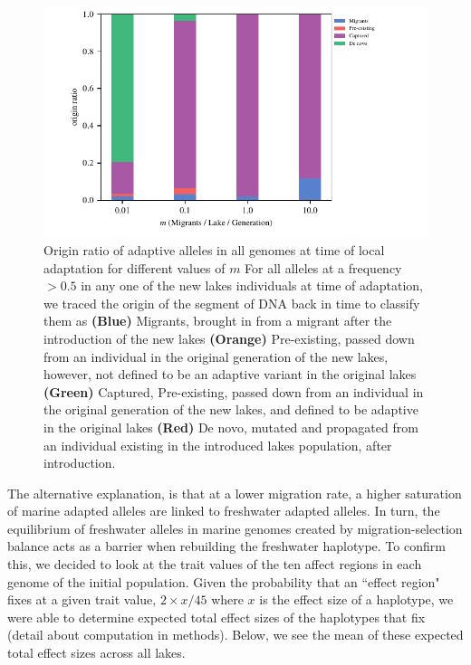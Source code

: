 \documentclass{article}
\begin{document}
\begin{figure}
	\begin{center}
  		\includegraphics[width=0.7\linewidth]{Final_Plots/Allele_Origin.pdf}
  		\caption{ 
		Origin ratio of adaptive alleles in all genomes at time of local adaptation for different values of $m$
		For all alleles at a frequency $> 0.5$ in any one of the new lakes individuals at time of adaptation, 
		we traced the origin of the segment of DNA back in time to classify them as 
		\textbf{(Blue)} Migrants, brought in from a migrant after the introduction of the new lakes 
		\textbf{(Orange)} Pre-existing, passed down from an individual in the original generation of the new lakes, 
		however, not defined to be an adaptive variant in the original lakes
		\textbf{(Green)} Captured, Pre-existing, passed down from an individual in the original generation of the new lakes, 
		and defined to be adaptive in the original lakes
		\textbf{(Red)} De novo, mutated and propagated from an individual existing in the introduced lakes population, after introduction. 
		}
  		\label{fig:Origin}
	\end{center}
\end{figure}

The alternative explanation, is that at a lower migration rate, a higher saturation of marine adapted alleles are linked to freshwater adapted alleles.
In turn, the equilibrium of freshwater alleles in marine genomes created by migration-selection balance acts as a barrier when rebuilding the freshwater haplotype. 
To confirm this, we decided to look at the trait values of the ten affect regions in each genome of the initial population.
Given the probability that an ``effect region" fixes at a given trait value, $2 \times x / 45$ where $x$ is the effect size of a haplotype,
we were able to determine expected total effect sizes of the haplotypes that fix (detail about computation in methods).
Below, we see the mean of these expected total effect sizes across all lakes.
\end{document}
